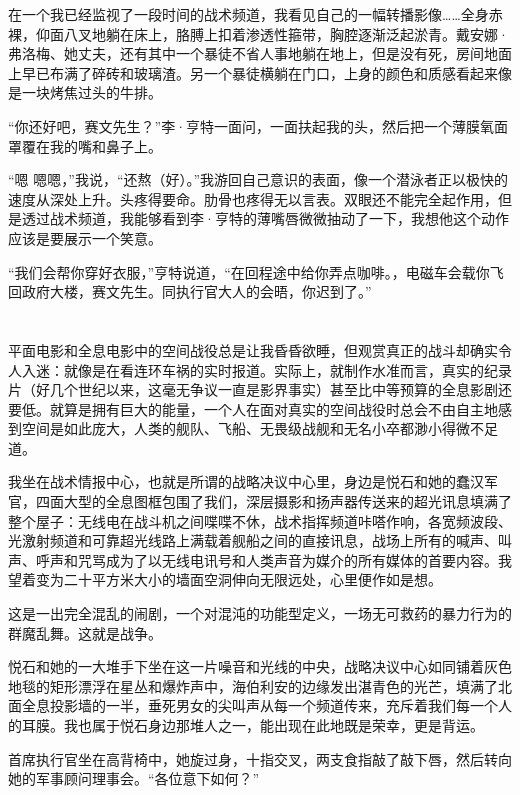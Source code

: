 \documentclass[AutoFakeBold=true]{book}
\begin{document}
在一个我已经监视了一段时间的战术频道，我看见自己的一幅转播影像……全身赤裸，仰面八叉地躺在床上，胳膊上扣着渗透性箍带，胸腔逐渐泛起淤青。戴安娜·弗洛梅、她丈夫，还有其中一个暴徒不省人事地躺在地上，但是没有死，房间地面上早已布满了碎砖和玻璃渣。另一个暴徒横躺在门口，上身的颜色和质感看起来像是一块烤焦过头的牛排。

``你还好吧，赛文先生？''李·亨特一面问，一面扶起我的头，然后把一个薄膜氧面罩覆在我的嘴和鼻子上。

``嗯 嗯嗯，''我说，``还熬（好）。''我游回自己意识的表面，像一个潜泳者正以极快的速度从深处上升。头疼得要命。肋骨也疼得无以言表。双眼还不能完全起作用，但是透过战术频道，我能够看到李·亨特的薄嘴唇微微抽动了一下，我想他这个动作应该是要展示一个笑意。

``我们会帮你穿好衣服，''亨特说道，``在回程途中给你弄点咖啡。，电磁车会载你飞回政府大楼，赛文先生。同执行官大人的会晤，你迟到了。''

\chapter{}

平面电影和全息电影中的空间战役总是让我昏昏欲睡，但观赏真正的战斗却确实令人入迷：就像是在看连环车祸的实时报道。实际上，就制作水准而言，真实的纪录片（好几个世纪以来，这毫无争议一直是影界事实）甚至比中等预算的全息影剧还要低。就算是拥有巨大的能量，一个人在面对真实的空间战役时总会不由自主地感到空间是如此庞大，人类的舰队、飞船、无畏级战舰和无名小卒都渺小得{\kaishu 微不足道}。

我坐在战术情报中心，也就是所谓的战略决议中心里，身边是悦石和她的蠢汉军官，四面大型的全息图框包围了我们，深层摄影和扬声器传送来的超光讯息填满了整个屋子：无线电在战斗机之间喋喋不休，战术指挥频道咔嗒作响，各宽频波段、光激射频道和可靠超光线路上满载着舰船之间的直接讯息，战场上所有的喊声、叫声、呼声和咒骂成为了以无线电讯号和人类声音为媒介的所有媒体的首要内容。我望着变为二十平方米大小的墙面空洞伸向无限远处，心里便作如是想。

这是一出完全混乱的闹剧，一个对混沌的功能型定义，一场无可救药的暴力行为的群魔乱舞。这就是战争。

\vspace*{1em}

悦石和她的一大堆手下坐在这一片噪音和光线的中央，战略决议中心如同铺着灰色地毯的矩形漂浮在星丛和爆炸声中，海伯利安的边缘发出湛青色的光芒，填满了北面全息投影墙的一半，垂死男女的尖叫声从每一个频道传来，充斥着我们每一个人的耳膜。我也属于悦石身边那堆人之一，能出现在此地既是荣幸，更是背运。

首席执行官坐在高背椅中，她旋过身，十指交叉，两支食指敲了敲下唇，然后转向她的军事顾问理事会。``各位意下如何？''
\end{document}
